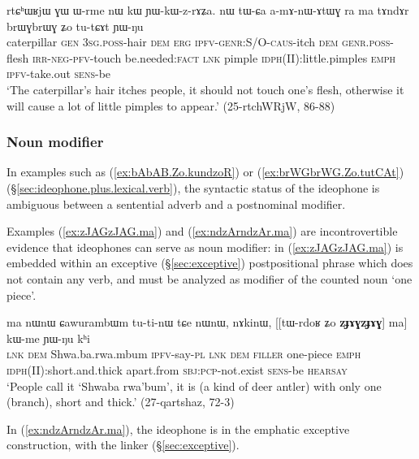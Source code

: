 \begin{exe}
\ex \label{ex:brWGbrWG.Zo.tutCAt}
\gll rtɕʰɯʁjɯ ɣɯ ɯ-rme nɯ kɯ ɲɯ-kɯ-z-rɤʑa. nɯ tɯ-ɕa a-mɤ-nɯ-ɤtɯɣ ra ma tɤndɤr brɯɣbrɯɣ ʑo tu-tɕɤt ɲɯ-ŋu  \\
caterpillar \textsc{gen} \textsc{3sg}.\textsc{poss}-hair \textsc{dem} \textsc{erg} \textsc{ipfv}-\textsc{genr}:S/O-\textsc{caus}-itch \textsc{dem} \textsc{genr}.\textsc{poss}-flesh \textsc{irr}-\textsc{neg}-\textsc{pfv}-touch be.needed:\textsc{fact} \textsc{lnk} pimple \textsc{idph}(II):little.pimples \textsc{emph} \textsc{ipfv}-take.out \textsc{sens}-be \\
\glt `The caterpillar's hair itches people, it should not touch one's flesh, otherwise it will cause a lot of little pimples to appear.' (25-rtchWRjW, 86-88)
\end{exe}
 
  
 \subsubsection{Noun modifier} \label{sec:ideophone.noun.modifier}
 In examples such as (\ref{ex:bAbAB.Zo.kundzoR}) or (\ref{ex:brWGbrWG.Zo.tutCAt}) (§\ref{sec:ideophone.plus.lexical.verb}), the syntactic status of the ideophone is ambiguous between a sentential adverb and a postnominal modifier. 
 
 Examples (\ref{ex:zJAGzJAG.ma}) and (\ref{ex:ndzArndzAr.ma}) are incontrovertible evidence that ideophones can serve as noun modifier: in (\ref{ex:zJAGzJAG.ma}) is embedded within an exceptive (§\ref{sec:exceptive}) postpositional phrase which does not contain any verb, and must be analyzed as modifier of the counted noun  `one piece'.
 
\begin{exe}
\ex \label{ex:zJAGzJAG.ma}
\gll ma nɯnɯ ɕawurambɯm tu-ti-nɯ tɕe nɯnɯ, nɤkinɯ, [[tɯ-rdoʁ ʑo \textbf{zɟɤɣzɟɤɣ}] ma] kɯ-me ɲɯ-ŋu kʰi \\
\textsc{lnk} \textsc{dem} Shwa.ba.rwa.mbum \textsc{ipfv}-say-\textsc{pl} \textsc{lnk} \textsc{dem} \textsc{filler} one-piece \textsc{emph} \textsc{idph}(II):short.and.thick apart.from \textsc{sbj}:\textsc{pcp}-not.exist \textsc{sens}-be \textsc{hearsay} \\
\glt `People call it `Shwaba rwa'bum', it is (a kind of deer antler) with only one (branch), short and thick.'  
 (27-qartshaz, 72-3)
\end{exe}

In (\ref{ex:ndzArndzAr.ma}), the ideophone  is in the emphatic exceptive construction, with the linker  (§\ref{sec:exceptive}).

